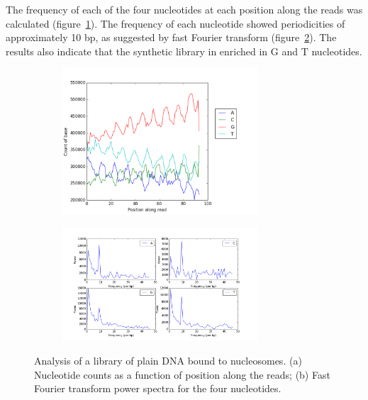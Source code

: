 \documentclass[parskip=full, numbers=noenddot]{scrbook}
\begin{document}
The frequency of each of the four nucleotides at each position along the reads was calculated (figure~\ref{fig:enriched_counts}). The frequency of each nucleotide showed periodicities of approximately 10 bp, as suggested by fast Fourier transform (figure~\ref{fig:enriched_power}).  The results also indicate that the synthetic library in enriched in G and T nucleotides.

\begin{figure}[htbp]
  \centering
  \begin{subfigure}[htbp]{0.8\textwidth}
    \centering
    \includegraphics[width=0.8\textwidth]{enriched-counts}
    \caption{}
    \label{fig:enriched_counts}
  \end{subfigure}
  \begin{subfigure}[htbp]{0.8\textwidth}
    \centering
    \includegraphics[width=0.8\textwidth]{enriched-power}
    \caption{}
    \label{fig:enriched_power}
  \end{subfigure}
  \caption{Analysis of a library of plain DNA bound to nucleosomes. (a) Nucleotide counts as a function of position along the reads; (b) Fast Fourier transform power spectra for the four nucleotides.}
  \label{fig:enriched}
\end{figure}
\end{document}
